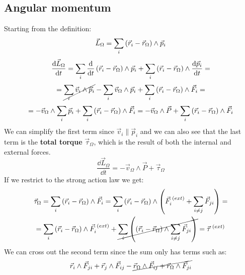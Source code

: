 \subsection{Angular momentum}
Starting from the definition:
\begin{equation}
    \vec{L}_{\Omega} = \displaystyle\sum_{i}\left(\vec{r}_i-\vec{r}_{\Omega}\right)\wedge\vec{p}_i
\end{equation}
\begin{equation}
    \dfrac{\dd{\vec{L}_{\Omega}}}{\dd{t}} = \displaystyle\sum_{i}\dfrac{\dd{}}{\dd{t}}\left(\vec{r}_i-\vec{r}_{\Omega}\right)\wedge\vec{p}_i + \displaystyle\sum_{i}\left(\vec{r}_i-\vec{r}_{\Omega}\right)\wedge\dfrac{\dd{\vec{p}_i}}{\dd{t}} =
\end{equation}
\begin{equation}
    = \cancel{\displaystyle\sum_{i}\vec{v}_i\wedge\vec{p}_i}-\displaystyle\sum_{i}\vec{v}_{\Omega}\wedge\vec{p}_i + \displaystyle\sum_{i}\left(\vec{r}_i-\vec{r}_{\Omega}\right)\wedge\vec{F}_i =
\end{equation}
\begin{equation}
    = -\vec{v}_{\Omega}\wedge\displaystyle\sum_{i}\vec{p}_i + \displaystyle\sum_{i}\left(\vec{r}_i-\vec{r}_{\Omega}\right)\wedge\vec{F}_i = -\vec{v}_{\Omega}\wedge\vec{P} + \displaystyle\sum_{i}\left(\vec{r}_i-\vec{r}_{\Omega}\right)\wedge\vec{F}_i
\end{equation}
We can simplify the first term since $\vec{v}_i \parallel \vec{p}_i$ and we can also see that the last term is the \textbf{total torque} $\vec{\tau}_{\Omega}$, which is the result of both the internal and external forces.
\begin{equation} \label{e:first_angular_expression}
    \dfrac{\dd{\vec{L}_{\Omega}}}{\dd{t}} = -\vec{v}_{\Omega}\wedge\vec{P} + \vec{\tau}_{\Omega}
\end{equation}
If we restrict to the strong action law we get:
\begin{equation}
    \vec{\tau}_{\Omega} = \displaystyle\sum_{i}\left(\vec{r}_i-\vec{r}_{\Omega}\right)\wedge\vec{F}_i = \displaystyle\sum_{i}\left(\vec{r}_i-\vec{r}_{\Omega}\right)\wedge\left(\vec{F}_i^{\;(ext)}+ \displaystyle\sum_{i\neq j}\vec{F}_{ji}\right) =
\end{equation}
\begin{equation}
    = \displaystyle\sum_{i}\left(\vec{r}_i-\vec{r}_{\Omega}\right)\wedge\vec{F}_i^{\;(ext)} + \cancel{\displaystyle\sum_{i}\left(\left(\vec{r}_i-\vec{r}_{\Omega}\right)\wedge\displaystyle\sum_{i\neq j}\vec{F}_{ji}\right)} = \vec{\tau}^{\;(ext)}
\end{equation}
We can cross out the second term since the sum only has terms such as:
\begin{equation}
    \vec{r}_i\wedge\vec{F}_{ji} + \vec{r}_j\wedge\vec{F}_{ij}- \cancel{{\vec{r}_{\Omega}\wedge\vec{F}_{ij}+\vec{r}_{\Omega}\wedge\vec{F}_{ji}}}
\end{equation}
